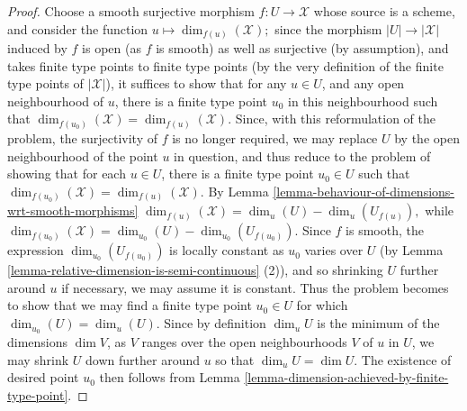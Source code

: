 \documentclass[10pt,a4paper]{amsart}
\theoremstyle{plain}
\theoremstyle{definition}
\theoremstyle{remark}
\numberwithin{equation}{subsection}
\begin{document}
\begin{proof}
Choose a smooth surjective
morphism  $f:U \to \mathcal{X}$ whose source is a scheme, and consider the
function $u \mapsto \dim_{f(u)}(\mathcal{X});$
since the morphism $|U| \to |\mathcal{X}|$ induced by $f$ is open (as $f$
is smooth) as well as  surjective (by assumption),
and takes finite type points to finite type points (by the very definition
of the finite type points of $|\mathcal{X}|$),
it suffices to show that for any $u \in U$, and any open neighbourhood of $u$,
there is a finite type point $u_0$ in this neighbourhood such that
$\dim_{f(u_0)}(\mathcal{X}) = \dim_{f(u)}(\mathcal{X}).$
Since, with this reformulation
of the problem,  the surjectivity of $f$ is no longer required,
we may replace $U$ by the open neighbourhood of the point $u$ in question,
and thus reduce to the problem of showing that for each $u \in U$,
there is a finite type point $u_0 \in U$ such that
$\dim_{f(u_0)}(\mathcal{X}) = \dim_{f(u)}(\mathcal{X}).$
By Lemma \ref{lemma-behaviour-of-dimensions-wrt-smooth-morphisms}
$\dim_{f(u)}(\mathcal{X}) = \dim_u(U) - \dim_u(U_{f(u)}),$
while
$\dim_{f(u_0)}(\mathcal{X}) = \dim_{u_0}(U) - \dim_{u_0}(U_{f(u_0)}).$
Since $f$ is smooth, the expression $\dim_{u_0}(U_{f(u_0)})$ is locally
constant as $u_0$ varies over $U$ (by
Lemma \ref{lemma-relative-dimension-is-semi-continuous} (2)),
and so shrinking $U$ further around
$u$ if necessary, we may assume it is constant.  Thus the problem
becomes to show that we may find a finite type point $u_0 \in U$
for which $\dim_{u_0}(U) = \dim_u(U)$.
Since by definition $\dim_u U$ is the minimum of the dimensions
$\dim V$, as $V$ ranges over the open neighbourhoods $V$ of $u$
in $U$, we may shrink $U$ down further around $u$ so that
$\dim_u U = \dim U$.
The existence of desired point $u_0$ then follows from
Lemma \ref{lemma-dimension-achieved-by-finite-type-point}.
\end{proof}
\end{document}
